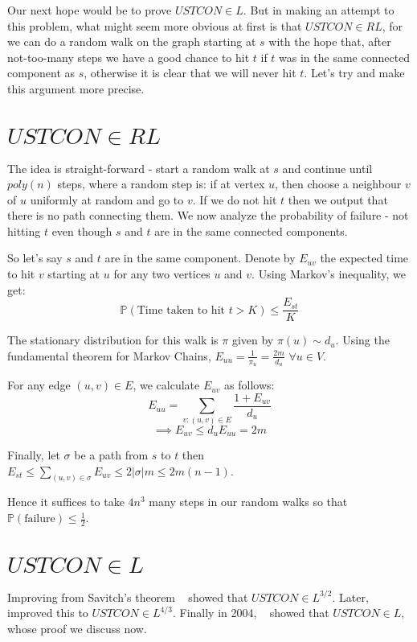 \documentclass[10pt]{article}
\theoremstyle{plain}
\theoremstyle{definition}
\begin{document}
Our next hope would be to prove $USTCON \in L$. But in making an attempt to this problem, what might seem more obvious at first is that $USTCON \in RL$, for we can do a random walk on the graph starting at $s$ with the hope that, after not-too-many steps we have a good chance to hit $t$ if $t$ was in the same connected component as $s$, otherwise it is clear that we will never hit $t$. Let's try and make this argument more precise.

\section{$USTCON \in RL$}

The idea is straight-forward - start a random walk at $s$ and continue until $poly(n)$ steps, where a random step is: if at vertex $u$, then choose a neighbour $v$ of $u$ uniformly at random and go to $v$. If we do not hit $t$ then we output that there is no path connecting them. We now analyze the probability of failure - not hitting $t$ even though $s$ and $t$ are in the same connected components.

So let's say $s$ and $t$ are in the same component. Denote by $E_{uv}$ the expected time to hit $v$ starting at $u$ for any two vertices $u$ and $v$. Using Markov's inequality, we get: 
$$\mathbb{P}(\text{Time taken to hit } t > K) \leq \frac{E_{st}}{K}$$

The stationary distribution for this walk is $\pi$ given by $\pi(u) \sim d_u$. Using the fundamental theorem for Markov Chains, $E_{uu} = \frac{1}{\pi_{u}} = \frac{2m}{d_u}$ $\forall u \in V$.

For any edge $(u,v) \in E$, we calculate $E_{uv}$ as follows:
$$E_{uu} = \sum_{v: (u,v) \in E} \frac{1 + E_{uv}}{d_u}$$
$$\implies E_{uv} \leq d_uE_{uu} = 2m$$

Finally, let $\sigma$ be a path from $s$ to $t$ then $E_{st} \leq \sum_{(u,v) \in \sigma} E_{uv} \leq 2|\sigma|m  \leq 2m(n-1)$.

Hence it suffices to take $4n^3$ many steps in our random walks so that $\mathbb{P}(\text{failure}) \leq \frac12$.

\section{$USTCON \in L$}

Improving from Savitch's theorem ~\cite{DBLP:conf/focs/NisanSW92} showed that $USTCON \in L^{3/2}$. Later, ~\cite{DBLP:journals/jacm/ArmoniTWZ00} improved this to $USTCON \in L^{4/3}$. Finally in 2004, ~\cite{DBLP:journals/eccc/ECCC-TR04-094} showed that $USTCON \in L$, whose proof we discuss now.
\end{document}
